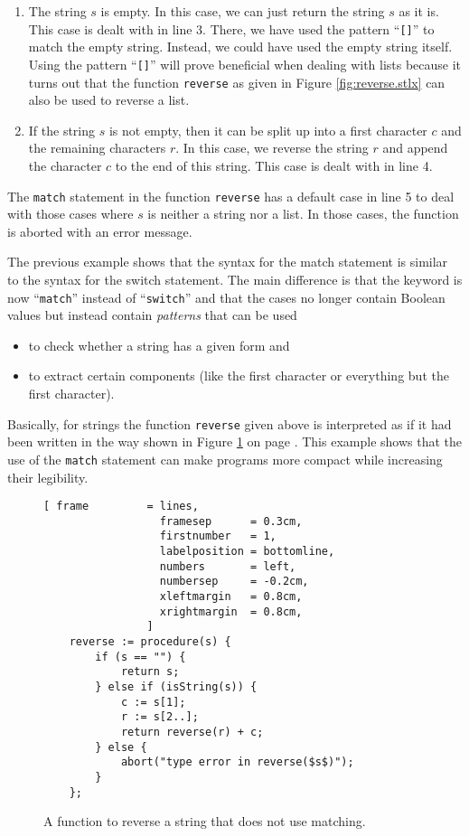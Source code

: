 \begin{enumerate}
\item The string $s$ is empty.  In this case, we can just return the string $s$ as it is.
      This case is dealt with in line 3.  There, we have used the pattern ``\texttt{[]}'' to match
      the empty string.  Instead, we could have used the empty string itself.  Using the pattern
      ``\texttt{[]}'' will prove beneficial when dealing with lists because it turns out that the
      function
      \texttt{reverse} as given in Figure \ref{fig:reverse.stlx} can also be used to reverse a list.
\item If the string $s$ is not empty, then it can be split up into a first character $c$ and the remaining
      characters $r$.  In this case, we reverse the string $r$ and append the character $c$ to the end of
      this string.  This case is dealt with in line 4.
\end{enumerate}
The \texttt{match} statement in the function \texttt{reverse}  has a default case in line 5 to deal with
those cases where $s$ is neither a string nor a list.  In those cases, the function is aborted with
an error message.

The previous example shows that the syntax for the match statement  is similar to the syntax for the switch
statement.  The main difference is that the keyword is now ``\texttt{match}'' instead of
``\texttt{switch}'' and that the cases no longer contain Boolean values but instead contain
\emph{patterns} that can be used 
\begin{itemize}
\item to check whether a string has a given form and 
\item to extract certain components (like the first character or everything but the first character).  
\end{itemize}
Basically, for strings the function \texttt{reverse} given above is interpreted as if it
had been written in the way shown in Figure \ref{fig:reverse-long.stlx} on page \pageref{fig:reverse-long.stlx}.
This example shows that the use of the \texttt{match} statement can make programs more compact while
increasing their legibility.

\begin{figure}[!ht]
\centering
\begin{Verbatim}[ frame         = lines, 
                  framesep      = 0.3cm, 
                  firstnumber   = 1,
                  labelposition = bottomline,
                  numbers       = left,
                  numbersep     = -0.2cm,
                  xleftmargin   = 0.8cm,
                  xrightmargin  = 0.8cm,
                ]
    reverse := procedure(s) {
        if (s == "") {
            return s;
        } else if (isString(s)) {
            c := s[1];
            r := s[2..];
            return reverse(r) + c;
        } else {
            abort("type error in reverse($s$)");
        }
    };
\end{Verbatim}
\vspace*{-0.3cm}
\caption{A function to reverse a string that does not use matching.}
\label{fig:reverse-long.stlx}
\end{figure}

